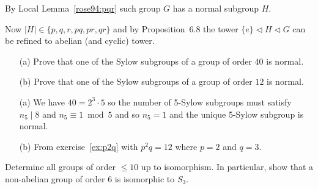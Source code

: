 \documentclass[12pt]{book}
\newcommand{\eG}{\ensuremath{\{e\}}}
\def\subnormal{\vartriangleleft}
\newcounter{myenumi}
\newenvironment{myenumerate}
{\begin{enumerate}
 \setcounter{enumi}{\themyenumi}
}
{\setcounter{myenumi}{\theenumi}
 \end{enumerate}}
\begin{document}
\begin{myenumerate}
By Local Lemma~\ref{rose94:pqr} such group $G$ has a normal subgroup $H$.

Now \(|H|\in \{p,q,r,pq,pr,qr\}\) and
by Proposition~6.8 the tower \(\eG\subnormal H\subnormal G\)
can be refined to abelian (and cyclic) tower.



\begin{excopy}
\begin{itemize}
 \item[(a)]
   Prove that one of the Sylow subgroups of a group of order $40$ is normal.
 \item[(b)]
   Prove that one of the Sylow subgroups of a group of order $12$ is normal.
\end{itemize}
\end{excopy} \label{ex:G40G12}

\begin{itemize}
\item[(a)] We have \(40=2^3\cdot5\) so the number of 5-Sylow subgroups
  must satisfy \(n_5\mid 8\) and \(n_5\equiv 1 \bmod 5\)
  and so \(n_5=1\) and the unique 5-Sylow subgroup is normal.
\item[(b)]
 From exercise~\ref{ex:p2q}  with \(p^2q=12\) where \(p=2\) and \(q=3\).
\end{itemize}

\begin{excopy}
Determine all groups of order \(\leq 10\) up to isomorphism.
In particular, show that a non-abelian group of order $6$
is isomorphic to \(S_3\).
\end{excopy}


\end{myenumerate}
\end{document}
